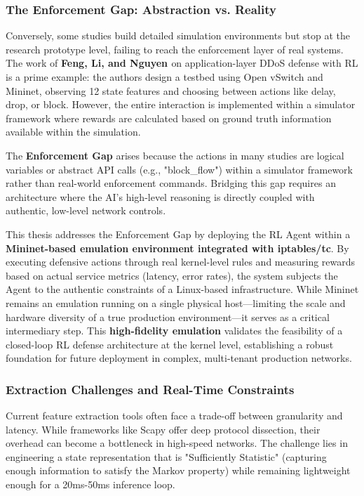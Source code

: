 \documentclass[12pt,a4paper]{report}
\begin{document}
\subsubsection*{The Enforcement Gap: Abstraction vs. Reality}

Conversely, some studies build detailed simulation environments but stop at the research prototype level, failing to reach the enforcement layer of real systems. The work of \textbf{Feng, Li, and Nguyen \cite{feng2020application}} on application-layer DDoS defense with RL is a prime example: the authors design a testbed using Open vSwitch and Mininet, observing 12 state features and choosing between actions like delay, drop, or block. However, the entire interaction is implemented within a simulator framework where rewards are calculated based on ground truth information available within the simulation.

The \textbf{Enforcement Gap} arises because the actions in many studies are logical variables or abstract API calls (e.g., "block\_flow") within a simulator framework rather than real-world enforcement commands. Bridging this gap requires an architecture where the AI's high-level reasoning is directly coupled with authentic, low-level network controls.

This thesis addresses the Enforcement Gap by deploying the RL Agent within a \textbf{Mininet-based emulation environment integrated with iptables/tc}. By executing defensive actions through real kernel-level rules and measuring rewards based on actual service metrics (latency, error rates), the system subjects the Agent to the authentic constraints of a Linux-based infrastructure. While Mininet remains an emulation running on a single physical host—limiting the scale and hardware diversity of a true production environment—it serves as a critical intermediary step. This \textbf{high-fidelity emulation} validates the feasibility of a closed-loop RL defense architecture at the kernel level, establishing a robust foundation for future deployment in complex, multi-tenant production networks.

\subsubsection*{Extraction Challenges and Real-Time Constraints}

Current feature extraction tools often face a trade-off between granularity and latency. While frameworks like Scapy \cite{scapy2007} offer deep protocol dissection, their overhead can become a bottleneck in high-speed networks. The challenge lies in engineering a state representation that is "Sufficiently Statistic" (capturing enough information to satisfy the Markov property) while remaining lightweight enough for a 20ms-50ms inference loop.
\end{document}
